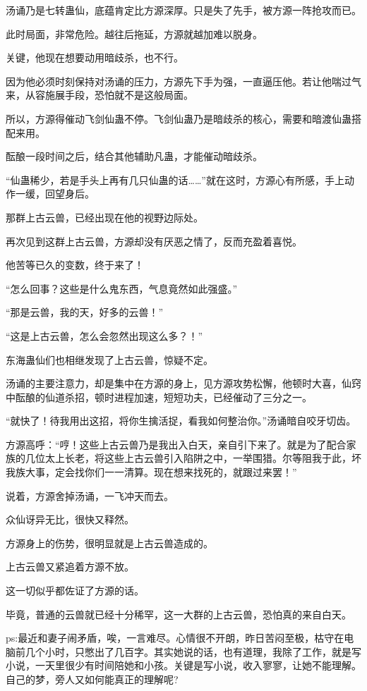 \begin{this_body}
汤诵乃是七转蛊仙，底蕴肯定比方源深厚。只是失了先手，被方源一阵抢攻而已。

此时局面，非常危险。越往后拖延，方源就越加难以脱身。

关键，他现在想要动用暗歧杀，也不行。

因为他必须时刻保持对汤诵的压力，方源先下手为强，一直逼压他。若让他喘过气来，从容施展手段，恐怕就不是这般局面。

所以，方源得催动飞剑仙蛊不停。飞剑仙蛊乃是暗歧杀的核心，需要和暗渡仙蛊搭配来用。

酝酿一段时间之后，结合其他辅助凡蛊，才能催动暗歧杀。

“仙蛊稀少，若是手头上再有几只仙蛊的话……”就在这时，方源心有所感，手上动作一缓，回望身后。

那群上古云兽，已经出现在他的视野边际处。

再次见到这群上古云兽，方源却没有厌恶之情了，反而充盈着喜悦。

他苦等已久的变数，终于来了！

“怎么回事？这些是什么鬼东西，气息竟然如此强盛。”

“那是云兽，我的天，好多的云兽！”

“这是上古云兽，怎么会忽然出现这么多？！”

东海蛊仙们也相继发现了上古云兽，惊疑不定。

汤诵的主要注意力，却是集中在方源的身上，见方源攻势松懈，他顿时大喜，仙窍中酝酿的仙道杀招，顿时进程加速，短短功夫，已经催动了三分之一。

“就快了！待我用出这招，将你生擒活捉，看我如何整治你。”汤诵暗自咬牙切齿。

方源高呼：“哼！这些上古云兽乃是我出入白天，亲自引下来了。就是为了配合家族的几位太上长老，将这些上古云兽引入陷阱之中，一举围猎。尔等阻我于此，坏我族大事，定会找你们一一清算。现在想来找死的，就跟过来罢！”

说着，方源舍掉汤诵，一飞冲天而去。

众仙讶异无比，很快又释然。

方源身上的伤势，很明显就是上古云兽造成的。

上古云兽又紧追着方源不放。

这一切似乎都佐证了方源的话。

毕竟，普通的云兽就已经十分稀罕，这一大群的上古云兽，恐怕真的来自白天。

ps:最近和妻子闹矛盾，唉，一言难尽。心情很不开朗，昨日苦闷至极，枯守在电脑前几个小时，只憋出了几百字。其实她说的话，也有道理，我除了工作，就是写小说，一天里很少有时间陪她和小孩。关键是写小说，收入寥寥，让她不能理解。自己的梦，旁人又如何能真正的理解呢?

\end{this_body}

